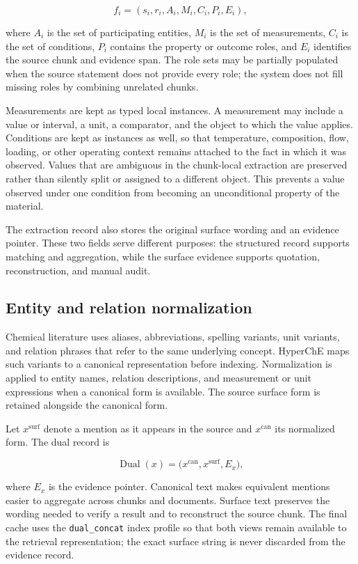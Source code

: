 \[
f_i=(s_i,r_i,A_i,M_i,C_i,P_i,E_i),
\]

where $A_i$ is the set of participating entities, $M_i$ is the set of measurements, $C_i$ is the set of conditions, $P_i$ contains the property or outcome roles, and $E_i$ identifies the source chunk and evidence span. The role sets may be partially populated when the source statement does not provide every role; the system does not fill missing roles by combining unrelated chunks.

Measurements are kept as typed local instances. A measurement may include a value or interval, a unit, a comparator, and the object to which the value applies. Conditions are kept as instances as well, so that temperature, composition, flow, loading, or other operating context remains attached to the fact in which it was observed. Values that are ambiguous in the chunk-local extraction are preserved rather than silently split or assigned to a different object. This prevents a value observed under one condition from becoming an unconditional property of the material.

The extraction record also stores the original surface wording and an evidence pointer. These two fields serve different purposes: the structured record supports matching and aggregation, while the surface evidence supports quotation, reconstruction, and manual audit.

\subsection{Entity and relation normalization}

Chemical literature uses aliases, abbreviations, spelling variants, unit variants, and relation phrases that refer to the same underlying concept. HyperChE maps such variants to a canonical representation before indexing. Normalization is applied to entity names, relation descriptions, and measurement or unit expressions when a canonical form is available. The source surface form is retained alongside the canonical form.

Let $x^{\mathrm{surf}}$ denote a mention as it appears in the source and $x^{\mathrm{can}}$ its normalized form. The dual record is

\[
\operatorname{Dual}(x)=
\bigl(x^{\mathrm{can}},x^{\mathrm{surf}},E_x\bigr),
\]

where $E_x$ is the evidence pointer. Canonical text makes equivalent mentions easier to aggregate across chunks and documents. Surface text preserves the wording needed to verify a result and to reconstruct the source chunk. The final cache uses the \texttt{dual\_concat} index profile so that both views remain available to the retrieval representation; the exact surface string is never discarded from the evidence record.

